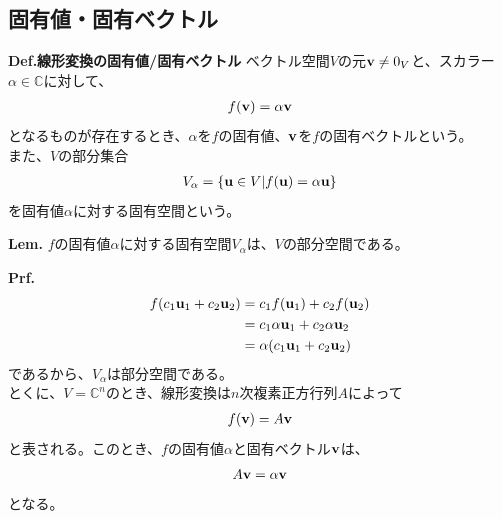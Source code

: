 \documentclass[a4paper,11pt]{jsarticle}
\numberwithin{equation}{section}
\begin{document}
\subsection{固有値・固有ベクトル}
\begin{itembox}[l]{\textbf{Def.線形変換の固有値/固有ベクトル}}
  ベクトル空間$V$の元$\vb{v} \neq 0_{V}$と、スカラー$\alpha\in \mathbb{C}$に対して、
  \begin{align}
    f(\vb{v}) = \alpha \vb{v}
  \end{align}
  となるものが存在するとき、$\alpha$を$f$の固有値、$\vb{v}$を$f$の固有ベクトルという。\\
  また、$V$の部分集合
  \begin{align}
    V_{\alpha} = \qty{\vb{u} \in V | f(\vb{u}) = \alpha \vb{u}}
  \end{align}
  を固有値$\alpha$に対する固有空間という。
\end{itembox}

\begin{itembox}[l]{\textbf{Lem.}}
  $f$の固有値$\alpha$に対する固有空間$V_{\alpha}$は、$V$の部分空間である。

\end{itembox}
\textbf{Prf.}\\
\begin{align}
  f(c_1\vb{u}_1 + c_2\vb{u}_2) &= c_1f(\vb{u}_1) + c_2f(\vb{u}_2)\\
  &= c_1\alpha\vb{u}_1 + c_2\alpha\vb{u}_2\\
  &= \alpha(c_1\vb{u}_1 + c_2\vb{u}_2)
\end{align}
であるから、$V_{\alpha}$は部分空間である。\hfill\qedsymbol\\

とくに、$V = \mathbb{C}^n$のとき、線形変換は$n$次複素正方行列$A$によって
\begin{align}
  f(\vb{v}) = A\vb{v}
\end{align}
と表される。このとき、$f$の固有値$\alpha$と固有ベクトル$\vb{v}$は、
\begin{align}
  A\vb{v} = \alpha\vb{v}
\end{align}
となる。
\end{document}
